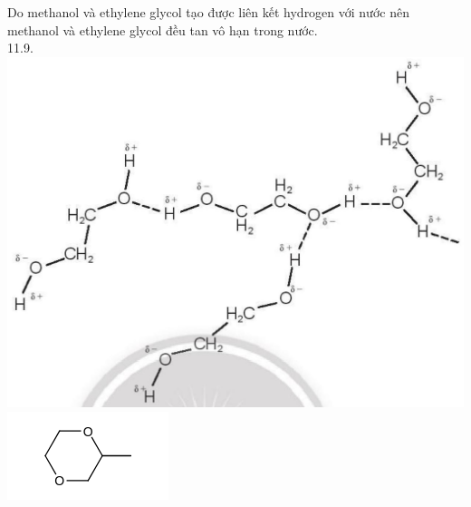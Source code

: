 \documentclass[10pt]{article}
\begin{document}
Do methanol và ethylene glycol tạo được liên kết hydrogen với nước nên methanol và ethylene glycol đều tan vô hạn trong nước.\\
11.9.\\
\includegraphics[max width=\textwidth, center]{2025_10_23_57761e23b8c46a11c3efg-30}\\
\includegraphics{smile-d578bdcc71cfd9983deb737ed51ed8d36c1167dd}
\end{document}
